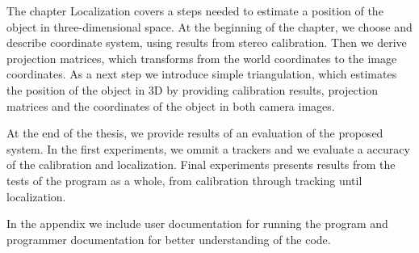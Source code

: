 The chapter Localization covers a steps needed to estimate a position of the
object in three-dimensional space. At the beginning of the chapter, we choose
and describe coordinate system, using results from stereo calibration. Then we
derive projection matrices, which transforms from the world coordinates to the
image coordinates. As a next step we introduce simple triangulation, which
estimates the position of the object in 3D by providing calibration results,
projection matrices and the coordinates of the object in both camera images.

At the end of the thesis, we provide results of an evaluation of the proposed
system. In the first experiments, we ommit a trackers and we evaluate a
accuracy of the calibration and localization. Final experiments presents
results from the tests of the program as a whole, from calibration through
tracking until localization. 

In the appendix we include user documentation for running the program and
programmer documentation for better understanding of the code.

